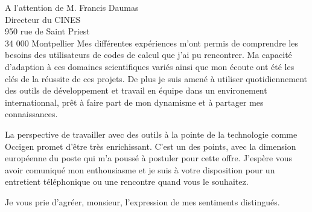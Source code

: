 \documentclass[10pt,a4paper]{lettre}
\begin{document}
\begin{letter}{A l'attention de M. Francis Daumas\\Directeur du CINES\\950 rue de Saint Priest\\34 000 Montpellier}
{Mes différentes expériences m'ont permis de comprendre les besoins des utilisateurs de codes
de calcul que j'ai pu rencontrer. Ma capacité d'adaption à ces domaines scientifiques variés
ainsi que mon écoute ont été les clés de la réussite de ces projets.
De plus je suis amené à utiliser quotidiennement des outils de
développement et travail en équipe dans un environement internationnal,
prêt à faire part de mon dynamisme et à partager mes connaissances.
}

{
La perspective de travailler avec des outils à la pointe de la technologie
comme Occigen promet d'être très enrichissant.
C'est un des points, avec la dimension européenne du poste qui m'a poussé à
postuler pour cette offre.
J'espère vous avoir comuniqué mon enthousiasme et je suis à votre
disposition pour un entretient téléphonique ou une rencontre quand vous
le souhaitez.
}

\closing{Je vous prie d'agréer, monsieur, l'expression de mes sentiments distingués.}
\end{letter}
\end{document}
